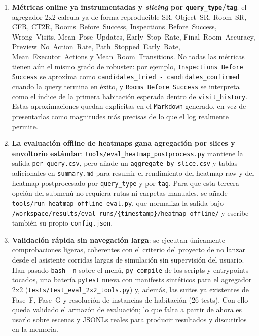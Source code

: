 \documentclass[11pt,a4paper]{article}
\begin{document}
\begin{enumerate}
  \item \textbf{Métricas online ya instrumentadas y \emph{slicing} por
        \texttt{query\_type}/\texttt{tag}}: el agregador 2x2 calcula ya de forma
        reproducible SR, Object~SR, Room~SR, CFR, CT2R,
        Rooms~Before~Success, Inspections~Before~Success, Wrong~Visits,
        Mean~Pose~Updates, Early~Stop~Rate, Final~Room~Accuracy,
        Preview~No~Action~Rate, Path~Stopped~Early~Rate,
        Mean~Executor~Actions y Mean~Room~Transitions. No todas las métricas
        tienen aún el mismo grado de robustez: por ejemplo,
        \texttt{Inspections Before Success} se aproxima como
        \texttt{candidates\_tried - candidates\_confirmed} cuando la query
        termina en éxito, y \texttt{Rooms Before Success} se interpreta como el
        índice de la primera habitación esperada dentro de \texttt{visit\_history}.
        Estas aproximaciones quedan explícitas en el \texttt{Markdown} generado,
        en vez de presentarlas como magnitudes más precisas de lo que el log
        realmente permite.

  \item \textbf{La evaluación offline de heatmaps gana agregación por slices y
        envoltorio estándar}: \texttt{tools/eval\_heatmap\_postprocess.py}
        mantiene la salida \texttt{per\_query.csv}, pero añade un
        \texttt{aggregate\_by\_slice.csv} y tablas adicionales en
        \texttt{summary.md} para resumir el rendimiento del heatmap raw y del
        heatmap postprocesado por \texttt{query\_type} y por \texttt{tag}. Para
        que esta tercera opción del submenú no requiera rutas ni carpetas
        manuales, se añade \texttt{tools/run\_heatmap\_offline\_eval.py}, que
        normaliza la salida bajo
        \texttt{/workspace/results/eval\_runs/\{timestamp\}/heatmap\_offline/}
        y escribe también su propio \texttt{config.json}.

  \item \textbf{Validación rápida sin navegación larga}: se ejecutan únicamente
        comprobaciones ligeras, coherentes con el criterio del proyecto de no
        lanzar desde el asistente corridas largas de simulación sin supervisión
        del usuario. Han pasado \texttt{bash -n} sobre el menú, \texttt{py\_compile}
        de los scripts y entrypoints tocados, una batería \texttt{pytest} nueva
        con manifests sintéticos para el agregador 2x2
        (\texttt{tests/test\_eval\_2x2\_tools.py}) y, además, las suites ya
        existentes de Fase~F, Fase~G y resolución de instancias de habitación
        (26 tests). Con ello queda validado el armazón de evaluación; lo que
        falta a partir de ahora es usarlo sobre escenas y JSONLs reales para
        producir resultados y discutirlos en la memoria.

\end{enumerate}
\end{document}
